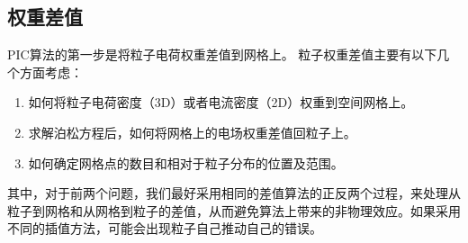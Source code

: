 \subsection{权重差值}
PIC算法的第一步是将粒子电荷权重差值到网格上。
粒子权重差值主要有以下几个方面考虑：

\begin{enumerate}
  \item 如何将粒子电荷密度（3D）或者电流密度（2D）权重到空间网格上。
  \item 求解泊松方程后，如何将网格上的电场权重差值回粒子上。
  \item 如何确定网格点的数目和相对于粒子分布的位置及范围。
\end{enumerate}

其中，对于前两个问题，我们最好采用相同的差值算法的正反两个过程，来处理从粒子到网格和从网格到粒子的差值，从而避免算法上带来的非物理效应。如果采用不同的插值方法，可能会出现粒子自己推动自己的错误。

